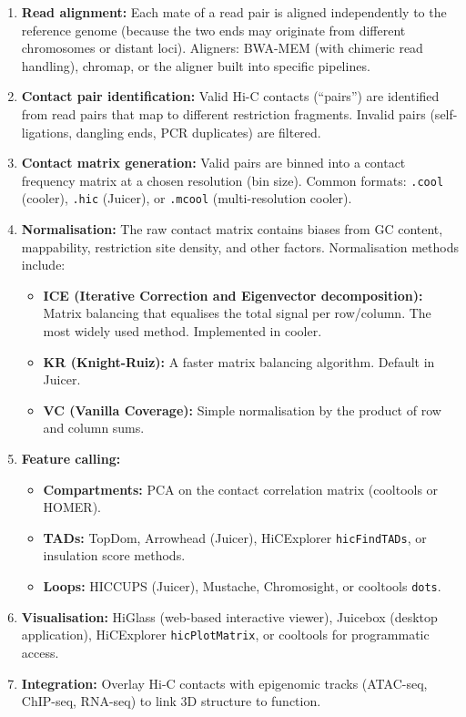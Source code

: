 \begin{enumerate}[itemsep=2pt]
  \item \textbf{Read alignment:} Each mate of a read pair is aligned independently to the reference genome (because the two ends may originate from different chromosomes or distant loci). Aligners: BWA-MEM (with chimeric read handling), chromap, or the aligner built into specific pipelines.
  \item \textbf{Contact pair identification:} Valid Hi-C contacts (``pairs'') are identified from read pairs that map to different restriction fragments. Invalid pairs (self-ligations, dangling ends, PCR duplicates) are filtered.
  \item \textbf{Contact matrix generation:} Valid pairs are binned into a contact frequency matrix at a chosen resolution (bin size). Common formats: \texttt{.cool} (cooler), \texttt{.hic} (Juicer), or \texttt{.mcool} (multi-resolution cooler).
  \item \textbf{Normalisation:} The raw contact matrix contains biases from GC content, mappability, restriction site density, and other factors. Normalisation methods include:
    \begin{itemize}[itemsep=1pt]
      \item \textbf{ICE (Iterative Correction and Eigenvector decomposition):} Matrix balancing that equalises the total signal per row/column. The most widely used method. Implemented in cooler.
      \item \textbf{KR (Knight-Ruiz):} A faster matrix balancing algorithm. Default in Juicer.
      \item \textbf{VC (Vanilla Coverage):} Simple normalisation by the product of row and column sums.
    \end{itemize}
  \item \textbf{Feature calling:}
    \begin{itemize}[itemsep=1pt]
      \item \textbf{Compartments:} PCA on the contact correlation matrix (cooltools or HOMER).
      \item \textbf{TADs:} TopDom, Arrowhead (Juicer), HiCExplorer \texttt{hicFindTADs}, or insulation score methods.
      \item \textbf{Loops:} HICCUPS (Juicer), Mustache, Chromosight, or cooltools \texttt{dots}.
    \end{itemize}
  \item \textbf{Visualisation:} HiGlass (web-based interactive viewer), Juicebox (desktop application), HiCExplorer \texttt{hicPlotMatrix}, or cooltools for programmatic access.
  \item \textbf{Integration:} Overlay Hi-C contacts with epigenomic tracks (ATAC-seq, ChIP-seq, RNA-seq) to link 3D structure to function.
\end{enumerate}


